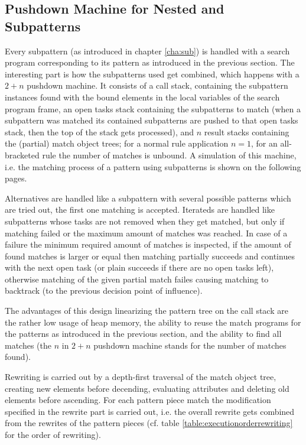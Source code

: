 \subsection*{Pushdown Machine for Nested and Subpatterns}\label{pushdownmachine}
Every subpattern (as introduced in chapter \ref{cha:sub}) is handled with a search program corresponding to its pattern as introduced in the previous section. 
The interesting part is how the subpatterns used get combined, which happens with a $2+n$ pushdown machine.
It consists of a call stack, containing the subpattern instances found with the bound elements in the local variables of the search program frame, an open tasks stack containing the subpatterns to match (when a subpattern was matched its contained subpatterns are pushed to that open tasks stack, then the top of the stack gets processed), and $n$ result stacks containing the (partial) match object trees; for a normal rule application $n=1$, for an all-bracketed rule the number of matches is unbound.
A simulation of this machine, i.e. the matching process of a pattern using subpatterns is shown on the following pages.

Alternatives are handled like a subpattern with several possible patterns which are tried out, the first one matching is accepted.
Iterateds are handled like subpatterns whose tasks are not removed when they get matched, but only if matching failed or the maximum amount of matches was reached. In case of a failure the minimum required amount of matches is inspected, if the amount of found matches is larger or equal then matching partially succeeds and continues with the next open task (or plain succeeds if there are no open tasks left), otherwise matching of the given partial match failes causing matching to backtrack (to the previous decision point of influence).

The advantages of this design linearizing the pattern tree on the call stack are the rather low usage of heap memory, the ability to reuse the match programs for the patterns as introduced in the previous section, and the ability to find all matches (the $n$ in $2+n$ pushdown machine stands for the number of matches found).

Rewriting is carried out by a depth-first traversal of the match object tree, creating new elements before decending, evaluating attributes and deleting old elements before ascending. For each pattern piece match the modification specified in the rewrite part is carried out, i.e. the overall rewrite gets combined from the rewrites of the pattern pieces (cf. table \ref{table:executionorderrewriting} for the order of rewriting).

